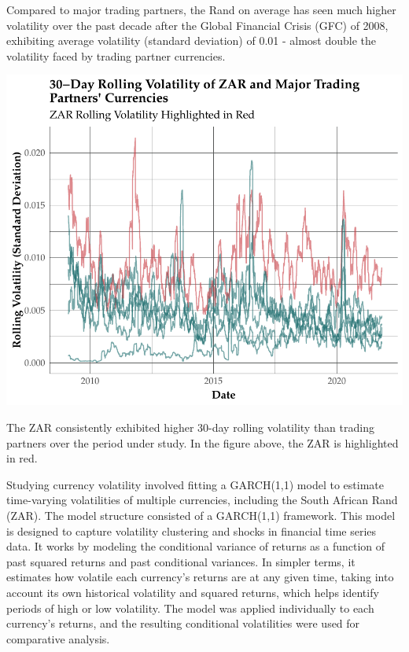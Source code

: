 \documentclass[11pt,preprint, authoryear]{elsarticle}
\numberwithin{equation}{section}
\numberwithin{figure}{section}
\numberwithin{table}{section}
\begin{document}
Compared to major trading partners, the Rand on average has seen much
higher volatility over the past decade after the Global Financial Crisis
(GFC) of 2008, exhibiting average volatility (standard deviation) of
0.01 - almost double the volatility faced by trading partner currencies.

\includegraphics{Question-5_files/figure-latex/unnamed-chunk-1-1.pdf}

The ZAR consistently exhibited higher 30-day rolling volatility than
trading partners over the period under study. In the figure above, the
ZAR is highlighted in red.

Studying currency volatility involved fitting a GARCH(1,1) model to
estimate time-varying volatilities of multiple currencies, including the
South African Rand (ZAR). The model structure consisted of a GARCH(1,1)
framework. This model is designed to capture volatility clustering and
shocks in financial time series data. It works by modeling the
conditional variance of returns as a function of past squared returns
and past conditional variances. In simpler terms, it estimates how
volatile each currency's returns are at any given time, taking into
account its own historical volatility and squared returns, which helps
identify periods of high or low volatility. The model was applied
individually to each currency's returns, and the resulting conditional
volatilities were used for comparative analysis.
\end{document}
